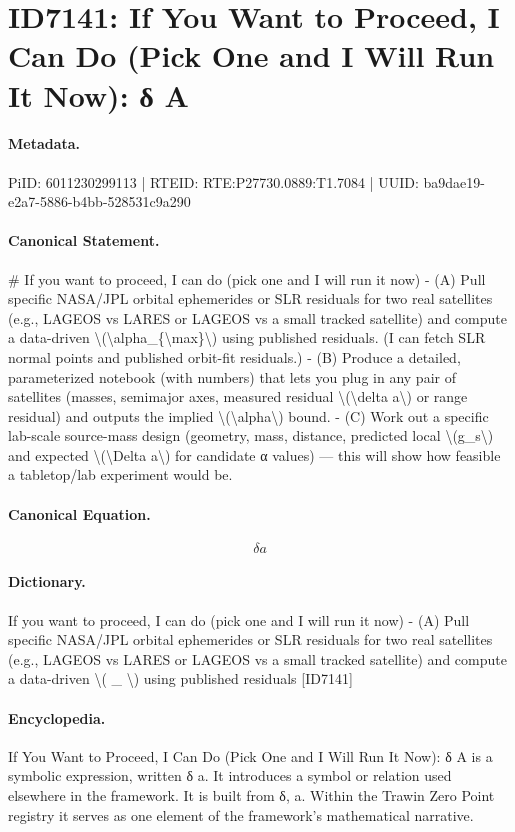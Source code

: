 \section*{ID7141: If You Want to Proceed, I Can Do (Pick One and I Will Run It Now): δ A}
\paragraph{Metadata.}
PiID: 6011230299113 | RTEID: RTE:P27730.0889:T1.7084 | UUID: ba9dae19-e2a7-5886-b4bb-528531c9a290

\paragraph{Canonical Statement.}
\# If you want to proceed, I can do (pick one and I will run it now) - (A) Pull specific NASA/JPL orbital ephemerides or SLR residuals for two real satellites (e.g., LAGEOS vs LARES or LAGEOS vs a small tracked satellite) and compute a data-driven \textbackslash{}(\textbackslash{}alpha\_\{\textbackslash{}max\}\textbackslash{}) using published residuals. (I can fetch SLR normal points and published orbit-fit residuals.) - (B) Produce a detailed, parameterized notebook (with numbers) that lets you plug in any pair of satellites (masses, semimajor axes, measured residual \textbackslash{}(\textbackslash{}delta a\textbackslash{}) or range residual) and outputs the implied \textbackslash{}(\textbackslash{}alpha\textbackslash{}) bound. - (C) Work out a specific lab-scale source-mass design (geometry, mass, distance, predicted local \textbackslash{}(g\_s\textbackslash{}) and expected \textbackslash{}(\textbackslash{}Delta a\textbackslash{}) for candidate α values) — this will show how feasible a tabletop/lab experiment would be.

\paragraph{Canonical Equation.}
\[
\delta a
\]

\paragraph{Dictionary.}
If you want to proceed, I can do (pick one and I will run it now) - (A) Pull specific NASA/JPL orbital ephemerides or SLR residuals for two real satellites (e.g., LAGEOS vs LARES or LAGEOS vs a small tracked satellite) and compute a data-driven \textbackslash{}( \_ \textbackslash{}) using published residuals [ID7141]

\paragraph{Encyclopedia.}
If You Want to Proceed, I Can Do (Pick One and I Will Run It Now): δ A is a symbolic expression, written δ a. It introduces a symbol or relation used elsewhere in the framework. It is built from δ, a. Within the Trawin Zero Point registry it serves as one element of the framework's mathematical narrative.
